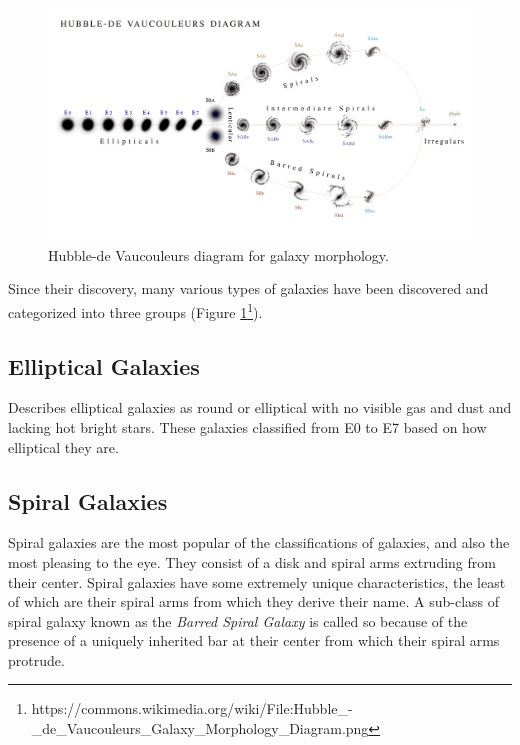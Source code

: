 \documentclass[12pt, oneside]{smuthesis}
\begin{document}
\begin{figure}
	\centering
	\includegraphics[width=\linewidth]{GalaxyClassificationChart}
	\caption{Hubble-de Vaucouleurs diagram for galaxy morphology.}
	\label{fig:classDiagram}
\end{figure}

Since their discovery, many various types of galaxies have been discovered and categorized into three groups (Figure \ref{fig:classDiagram}\footnote{https://commons.wikimedia.org/wiki/File:Hubble\_-\_de\_Vaucouleurs\_Galaxy\_Morphology\_Diagram.png}).

\subsection{\sc Elliptical Galaxies} \label{ellipticalGalaxies}

\cite{sag} Describes elliptical galaxies as round or elliptical with no visible gas and dust and lacking hot bright stars. These galaxies classified from E0 to E7 based on how elliptical they are.

\subsection{\sc Spiral Galaxies} \label{spiralGalaxies}

Spiral galaxies are the most popular of the classifications of galaxies, and also the most pleasing to the eye. They consist of a disk and spiral arms extruding from their center. Spiral galaxies have some extremely unique characteristics, the least of which are their spiral arms from which they derive their name. A sub-class of spiral galaxy known as the \textit{Barred Spiral Galaxy} is called so because of the presence of a uniquely inherited bar at their center from which their spiral arms protrude.
\end{document}
